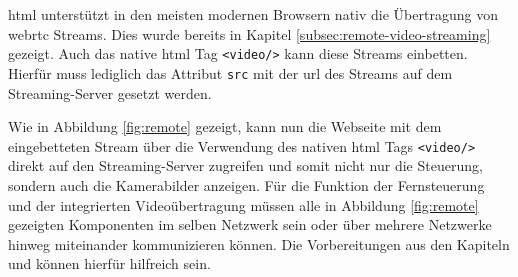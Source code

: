 
\gls{html} unterstützt in den meisten modernen Browsern nativ die Übertragung von \gls{webrtc} Streams.
Dies wurde bereits in Kapitel \ref{subsec:remote-video-streaming} gezeigt.
Auch das native \gls{html} Tag \texttt{<video/>} kann diese Streams einbetten.
Hierfür muss lediglich das Attribut \texttt{src} mit der \gls{url} des Streams auf dem Streaming-Server gesetzt werden.

Wie in Abbildung \ref{fig:remote} gezeigt, kann nun die Webseite mit dem eingebetteten Stream über die Verwendung des
nativen \gls{html} Tags \texttt{<video/>} direkt auf den Streaming-Server zugreifen und somit nicht nur die Steuerung,
sondern auch die Kamerabilder anzeigen.
Für die Funktion der Fernsteuerung und der integrierten Videoübertragung müssen alle in Abbildung \ref{fig:remote} gezeigten
Komponenten im selben Netzwerk sein oder über mehrere Netzwerke hinweg miteinander kommunizieren können.
Die Vorbereitungen aus den Kapiteln  und  können hierfür hilfreich sein.